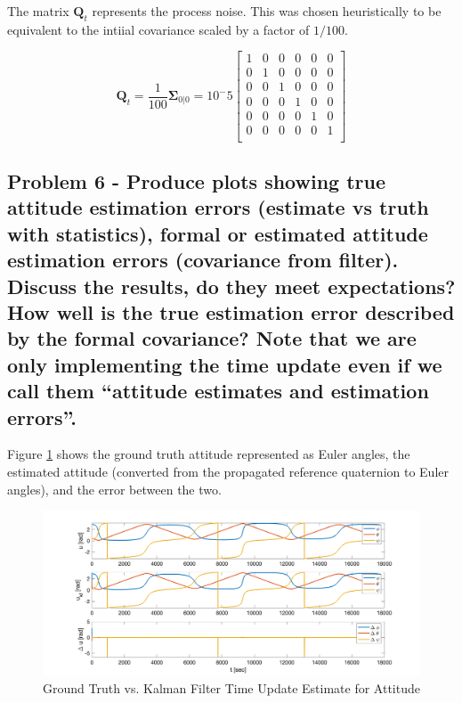 The matrix $\boldsymbol{Q}_t$ represents the process noise. This was chosen heuristically to be equivalent to the intiial covariance scaled by a factor of $1/100$. 

\begin{equation*}
    \boldsymbol{Q}_t = \frac{1}{100} \boldsymbol{\Sigma}_{0 \vert 0} = 10^-5 \begin{bmatrix}
        1 & 0 & 0 & 0 & 0 & 0 \\
        0 & 1 & 0 & 0 & 0 & 0 \\
        0 & 0 & 1 & 0 & 0 & 0 \\
        0 & 0 & 0 & 1 & 0 & 0 \\
        0 & 0 & 0 & 0 & 1 & 0 \\
        0 & 0 & 0 & 0 & 0 & 1 \\
    \end{bmatrix}
\end{equation*}

\subsection{Problem 6 - Produce plots showing true attitude estimation errors (estimate vs truth with statistics), formal or estimated attitude estimation errors (covariance from filter). Discuss the results, do they meet expectations? How well is the true estimation error described by the formal covariance? Note that we are only implementing the time update even if we call them “attitude estimates and estimation errors”.}

Figure \ref{fig:kf_quat_prop} shows the ground truth attitude represented as Euler angles, the estimated attitude (converted from the propagated reference quaternion to Euler angles), and the error between the two.

\begin{figure}[H]
    \centering
    \captionsetup{ justification = centering}
    \includegraphics[width = 15cm]{Images/PS7/kalman_filter_time_update_error_attitude.png}
    \caption{Ground Truth vs. Kalman Filter Time Update Estimate for Attitude}
    \label{fig:kf_quat_prop}
\end{figure}

